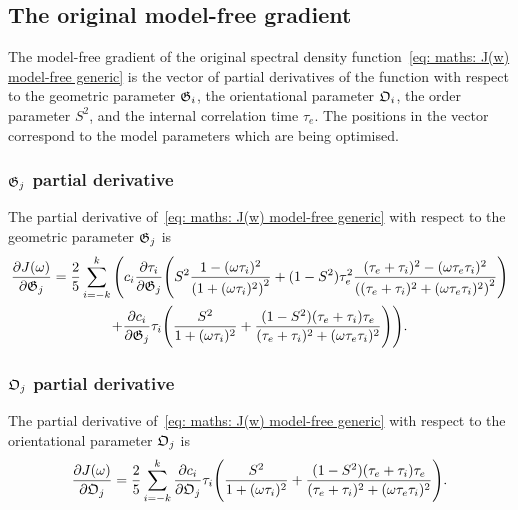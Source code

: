 
\subsection{The original model-free gradient}

The model-free gradient of the original spectral density function~\eqref{eq: maths: J(w) model-free generic} is the vector of partial derivatives of the function with respect to the geometric parameter $\mathfrak{G}_i$, the orientational parameter $\mathfrak{O}_i$, the order parameter $S^2$, and the internal correlation time $\tau_e$.  The positions in the vector correspond to the model parameters which are being optimised.



\subsubsection{$\mathfrak{G}_j$ partial derivative}

The partial derivative of~\eqref{eq: maths: J(w) model-free generic} with respect to the geometric parameter $\mathfrak{G}_j$ is
\begin{multline}
    \frac{\partial J(\omega)}{\partial \mathfrak{G}_j} = \frac{2}{5} \sum_{i=-k}^k \Bigg(
        c_i \frac{\partial \tau_i}{\partial \mathfrak{G}_j} \Bigg(
            S^2 \frac{1 - (\omega \tau_i)^2}{\left(1 + (\omega \tau_i)^2 \right)^2}
            + (1 - S^2) \tau_e^2 \frac{(\tau_e + \tau_i)^2 - (\omega \tau_e \tau_i)^2}{\left((\tau_e + \tau_i)^2 + (\omega \tau_e \tau_i)^2 \right)^2}
        \Bigg) \\
        +  \frac{\partial c_i}{\partial \mathfrak{G}_j} \tau_i \Bigg(
            \frac{S^2}{1 + (\omega \tau_i)^2}
            + \frac{(1 - S^2)(\tau_e + \tau_i)\tau_e}{(\tau_e + \tau_i)^2 + (\omega \tau_e \tau_i)^2}
        \Bigg)
    \Bigg).
\end{multline}



\subsubsection{$\mathfrak{O}_j$ partial derivative}

The partial derivative of~\eqref{eq: maths: J(w) model-free generic} with respect to the orientational parameter $\mathfrak{O}_j$ is
\begin{equation}
    \frac{\partial J(\omega)}{\partial \mathfrak{O}_j} = \frac{2}{5} \sum_{i=-k}^k \frac{\partial c_i}{\partial \mathfrak{O}_j} \tau_i \Bigg(
        \frac{S^2}{1 + (\omega \tau_i)^2}
        + \frac{(1 - S^2)(\tau_e + \tau_i)\tau_e}{(\tau_e + \tau_i)^2 + (\omega \tau_e \tau_i)^2}
    \Bigg).
\end{equation}



